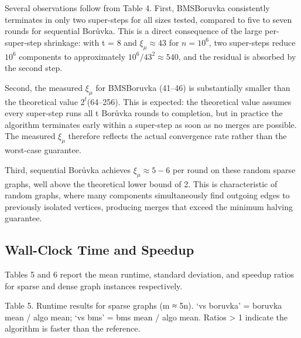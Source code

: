 \documentclass[11pt]{article}
\theoremstyle{plain}
\theoremstyle{remark}
\begin{document}
Several observations follow from Table 4. First, BMSBoruvka consistently
terminates in only two super-steps for all sizes tested, compared to
five to seven rounds for sequential Borůvka. This is a direct
consequence of the large per-super-step shrinkage: with t = 8 and
\(\xi_{\mu} \approx 43\) for \(n = 10^{6}\), two super-steps reduce
\(10^{6}\) components to approximately
\(10^{6}\text{/}43^{2} \approx 540\), and the residual is absorbed by
the second step.

Second, the measured \(\xi_{\mu}\) for BMSBoruvka (41--46) is
substantially smaller than the theoretical value \(2^{t}\)(64--256).
This is expected: the theoretical value assumes every super-step runs
all t Borůvka rounds to completion, but in practice the algorithm
terminates early within a super-step as soon as no merges are possible.
The measured \(\xi_{\mu}\) therefore reflects the actual convergence
rate rather than the worst-case guarantee.

Third, sequential Borůvka achieves \(\xi_{\mu} \approx 5 - 6\) per round
on these random sparse graphs, well above the theoretical lower bound of
2. This is characteristic of random graphs, where many components
simultaneously find outgoing edges to previously isolated vertices,
producing merges that exceed the minimum halving guarantee.

\subsection{Wall-Clock Time and Speedup}

Tables 5 and 6 report the mean runtime, standard deviation, and speedup
ratios for sparse and dense graph instances respectively.

Table 5. Runtime results for sparse graphs (m ≈ 5n). `vs boruvka' =
boruvka mean / algo mean; `vs bms' = bms mean / algo mean. Ratios
\textgreater{} 1 indicate the algorithm is faster than the reference.
\end{document}
